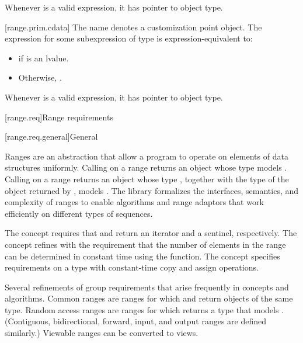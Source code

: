 \pnum
\begin{note}
Whenever  is a valid expression, it
has pointer to object type.
\end{note}

[range.prim.cdata]{}
\pnum
The name  denotes a customization point
object. The expression
 for some subexpression  of type 
is expression-equivalent to:
\begin{itemize}
\item {} if  is an lvalue.

\item Otherwise, .
\end{itemize}

\pnum
\begin{note}
Whenever  is a valid expression, it
has pointer to object type.
\end{note}

[range.req]{Range requirements}

[range.req.general]{General}

\pnum
Ranges are an abstraction that allow a \Cpp{} program
to operate on elements of data structures uniformly.
Calling  on a range returns an object
whose type models .
Calling  on a range returns an object whose type ,
together with the type  of the object returned by ,
models .
The library formalizes the interfaces, semantics, and complexity of ranges
to enable algorithms and range adaptors that work efficiently
on different types of sequences.

\pnum
The  concept requires that
 and 
return an iterator and a sentinel, respectively.
The  concept refines  with
the requirement that the number of elements in the range can be determined
in constant time using the  function.
The  concept specifies requirements on a  type
with constant-time copy and assign operations.

\pnum
Several refinements of  group requirements
that arise frequently in concepts and algorithms.
Common ranges are ranges for which
 and 
return objects of the same type.
Random access ranges are ranges for which 
returns a type that models
.
(Contiguous, bidirectional, forward, input, and output ranges
are defined similarly.)
Viewable ranges can be converted to views.

